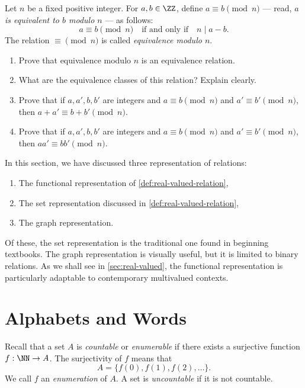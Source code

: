 \begin{exercise}
  Let $n$ be a fixed positive integer.
  For $a,b\in\ZZ$, define $a \equiv b \pmod{n}$ --- read, \textit{$a$ is equivalent to $b$ modulo $n$} --- as follows:
  \[
    a \equiv b \pmod{n}
    \quad\text{if and only if}\quad
    n\mid a-b.
  \]
  The relation $ \equiv  \pmod{n}$ is called \emph{equivalence modulo $n$}.
  \begin{enumerate}
  \item
    Prove that equivalence  modulo $n$ is an equivalence relation.
  \item
    What are the equivalence classes of this relation?
    Explain clearly.
  \item
    Prove that if $a, a', b, b'$ are integers and $a \equiv b \pmod{n}$ and $a' \equiv b' \pmod{n}$, then $a+a' \equiv b+b' \pmod{n}$.
  \item
    Prove that if $a, a', b, b'$ are integers and $a \equiv b \pmod{n}$ and $a' \equiv b' \pmod{n}$, then $aa' \equiv bb' \pmod{n}$.
  \end{enumerate}
\end{exercise}

In this section, we have discussed three representation of relations:

\begin{enumerate}
\item
  The functional representation of \cref{def:real-valued-relation},
\item
  The set representation discussed in \ref{def:real-valued-relation},
\item
  The graph representation.
\end{enumerate}

Of these, the set representation is the traditional one found in beginning textbooks.
The graph representation is visually useful, but it is limited to binary relations.
As we shall see in \cref{sec:real-valued}, the functional representation is particularly adaptable to contemporary multivalued contexts.

\section{Alphabets and Words}

Recall that a set $A$ is \emph{countable} or \emph{enumerable} if there exists a surjective function $f:\NN \to A$.
The surjectivity of $f$ means that
\[
  A=\{ f(0), f(1), f(2), \dots \}.
\]
We call $f$ an \emph{enumeration} of $A$.
A set is \emph{uncountable} if it is not countable.

